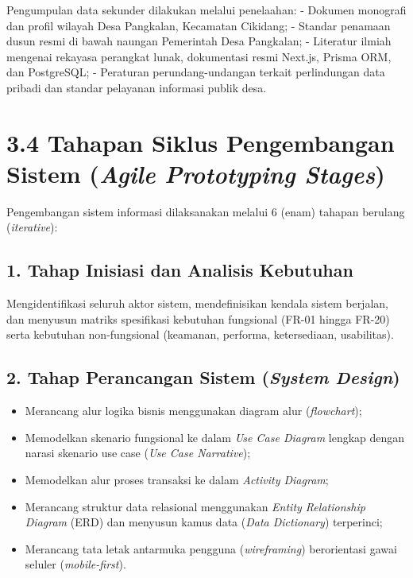 \documentclass[
  indonesian,
  12pt,
]{report}
\providecommand{\tightlist}{%
  \setlength{\itemsep}{0pt}\setlength{\parskip}{0pt}}
\begin{document}
Pengumpulan data sekunder dilakukan melalui penelaahan: - Dokumen
monografi dan profil wilayah Desa Pangkalan, Kecamatan Cikidang; -
Standar penamaan dusun resmi di bawah naungan Pemerintah Desa Pangkalan;
- Literatur ilmiah mengenai rekayasa perangkat lunak, dokumentasi resmi
Next.js, Prisma ORM, dan PostgreSQL; - Peraturan perundang-undangan
terkait perlindungan data pribadi dan standar pelayanan informasi publik
desa.

\section{\texorpdfstring{3.4 Tahapan Siklus Pengembangan Sistem
(\emph{Agile Prototyping
Stages})}{3.4 Tahapan Siklus Pengembangan Sistem (Agile Prototyping Stages)}}\label{tahapan-siklus-pengembangan-sistem-agile-prototyping-stages}

Pengembangan sistem informasi dilaksanakan melalui 6 (enam) tahapan
berulang (\emph{iterative}):

\subsection{1. Tahap Inisiasi dan Analisis
Kebutuhan}\label{tahap-inisiasi-dan-analisis-kebutuhan}

Mengidentifikasi seluruh aktor sistem, mendefinisikan kendala sistem
berjalan, dan menyusun matriks spesifikasi kebutuhan fungsional (FR-01
hingga FR-20) serta kebutuhan non-fungsional (keamanan, performa,
ketersediaan, usabilitas).

\subsection{\texorpdfstring{2. Tahap Perancangan Sistem (\emph{System
Design})}{2. Tahap Perancangan Sistem (System Design)}}\label{tahap-perancangan-sistem-system-design}

\begin{itemize}
\tightlist
\item
  Merancang alur logika bisnis menggunakan diagram alur
  (\emph{flowchart});
\item
  Memodelkan skenario fungsional ke dalam \emph{Use Case Diagram}
  lengkap dengan narasi skenario use case (\emph{Use Case Narrative});
\item
  Memodelkan alur proses transaksi ke dalam \emph{Activity Diagram};
\item
  Merancang struktur data relasional menggunakan \emph{Entity
  Relationship Diagram} (ERD) dan menyusun kamus data (\emph{Data
  Dictionary}) terperinci;
\item
  Merancang tata letak antarmuka pengguna (\emph{wireframing})
  berorientasi gawai seluler (\emph{mobile-first}).
\end{itemize}
\end{document}
